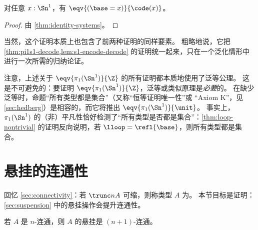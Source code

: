\begin{cor}
  对任意 $x:\Sn^1$，有 $\eqv{(\base=x)}{\code(x)}$。
\end{cor}
\begin{proof}
  由 \cref{thm:identity-systems}。
\end{proof}

当然，这个证明本质上也包含了前两种证明的同样要素。
粗略地说，它把 \cref{thm:pi1s1-decode,lem:s1-encode-decode} 的证明统一起来，只在一个泛化情形中进行一次所需的归纳论证。

\begin{rmk}
  注意，上述关于 $\eqv{\pi_1(\Sn^1)}{\Z}$ 的所有证明都本质地使用了泛等公理。
  这是不可避免的：要证明 $\eqv{\pi_1(\Sn^1)}{\Z}$，泛等或类似原理是\emph{必要}的。
  在缺少泛等时，命题“所有类型都是集合”（又称“恒等证明唯一性”或 “Axiom K”，见 \cref{sec:hedberg}）是相容的，而它将推出 $\eqv{\pi_1(\Sn^1)}{\unit}$。
  事实上，$\pi_1(\Sn^1)$ 的（非）平凡性恰好检测了“所有类型是否都是集合”：\cref{thm:loop-nontrivial} 的证明反向说明，若 $\lloop=\refl{\base}$，则所有类型都是集合。
\end{rmk}
\section{悬挂的连通性}
\label{sec:conn-susp}

回忆 \cref{sec:connectivity}：若 $\trunc nA$ 可缩，则称类型 $A$ 为。
本节目标是证明：\cref{sec:suspension} 中的悬挂操作会提升连通性。

\begin{thm} \label{thm:suspension-increases-connectedness}
  若 $A$ 是 $n$-连通，则 $A$ 的悬挂是 $(n+1)$-连通。
\end{thm}


